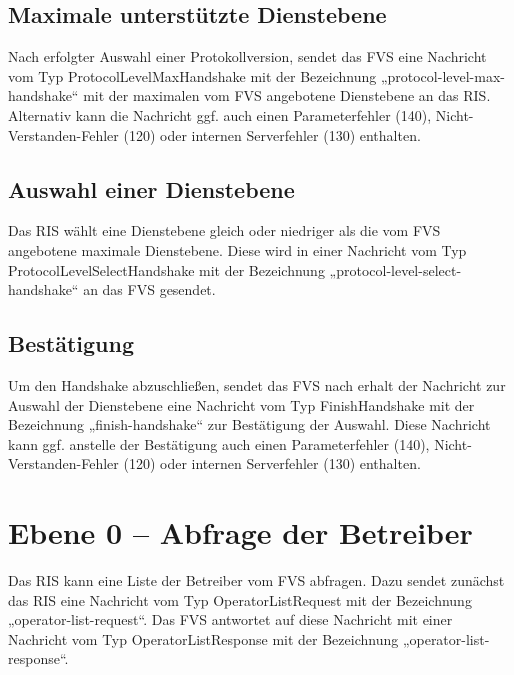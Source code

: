 

\subsection{Maximale unterstützte Dienstebene}
Nach erfolgter Auswahl einer Protokollversion, sendet das FVS eine Nachricht vom Typ ProtocolLevelMaxHandshake mit der Bezeichnung „protocol-level-max-handshake“ mit der maximalen vom FVS angebotene Dienstebene an das RIS. Alternativ kann die Nachricht ggf. auch einen Parameterfehler (140), Nicht-Verstanden-Fehler (120) oder internen Serverfehler (130) enthalten.



\subsection{Auswahl einer Dienstebene}
Das RIS wählt eine Dienstebene gleich oder niedriger als die vom FVS angebotene maximale Dienstebene. Diese wird in einer Nachricht vom Typ ProtocolLevelSelectHandshake mit der Bezeichnung „protocol-level-select-handshake“ an das FVS gesendet.



\subsection{Bestätigung}
Um den Handshake abzuschließen, sendet das FVS nach erhalt der Nachricht zur Auswahl der Dienstebene eine Nachricht vom Typ FinishHandshake mit der Bezeichnung „finish-handshake“ zur Bestätigung der Auswahl. Diese Nachricht kann ggf. anstelle der Bestätigung auch einen Parameterfehler (140), Nicht-Verstanden-Fehler (120) oder internen Serverfehler (130) enthalten. 




\section{Ebene 0 -- Abfrage der Betreiber}
Das RIS kann eine Liste der Betreiber vom FVS abfragen. Dazu sendet zunächst das RIS eine Nachricht vom Typ OperatorListRequest mit der Bezeichnung „operator-list-request“. Das FVS antwortet auf diese Nachricht mit einer Nachricht vom Typ OperatorListResponse mit der Bezeichnung „operator-list-response“.


